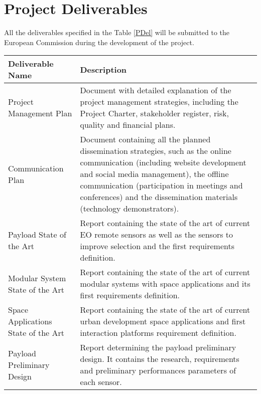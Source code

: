 \section{Project Deliverables}

All the deliverables specified in the Table \ref{PDel} will be submitted to the European Commission during the development of the project. 

\begin{longtable}[H]{p{4cm}p{10cm}}
	
	\toprule[2pt]
	
	\textbf{Deliverable Name} & \textbf{Description} \\ 
	
	\midrule[1.5pt] 
	\endhead
	
	
	Project Management Plan & 
	Document with detailed explanation of the project management strategies, including the Project Charter, stakeholder register, risk, quality and financial plans. 
	\vspace{0.2cm}
	\\ \midrule
	
	Communication Plan  & 
	Document containing all the planned dissemination strategies, such as the online communication (including website development and social media management), the offline communication (participation in meetings and conferences) and the dissemination materials (technology demonstrators). 
	\vspace{0.2cm}
	\\ \midrule

	Payload State of the Art  & 
	Report containing the state of the art of current EO remote sensors as well as the sensors to improve selection and the first requirements definition.  
	\vspace{0.2cm}
	\\ \midrule

	Modular System State of the Art  & 
	Report containing the state of the art of current modular systems with space applications and its first requirements definition.  
	\vspace{0.2cm}
	\\ \midrule

	Space Applications State of the Art & 
	Report containing the state of the art of current urban development space applications and first interaction platforms requirement definition.  
	\vspace{0.2cm}
	\\ \midrule

	Payload Preliminary Design  & 
	Report determining the payload preliminary design. It contains the research, requirements and preliminary performances parameters of each sensor.
	 \vspace{0.2cm}
	\\ \midrule


\end{longtable}
